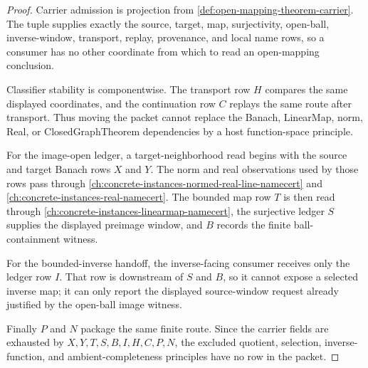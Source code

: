 \begin{proof}
Carrier admission is projection from \autoref{def:open-mapping-theorem-carrier}. The tuple supplies exactly the source, target, map, surjectivity, open-ball, inverse-window, transport, replay, provenance, and local name rows, so a consumer has no other coordinate from which to read an open-mapping conclusion.

Classifier stability is componentwise. The transport row $H$ compares the same displayed coordinates, and the continuation row $C$ replays the same route after transport. Thus moving the packet cannot replace the Banach, LinearMap, norm, Real, or ClosedGraphTheorem dependencies by a host function-space principle.

For the image-open ledger, a target-neighborhood read begins with the source and target Banach rows $X$ and $Y$. The norm and real observations used by those rows pass through \autoref{ch:concrete-instances-normed-real-line-namecert} and \autoref{ch:concrete-instances-real-namecert}. The bounded map row $T$ is then read through \autoref{ch:concrete-instances-linearmap-namecert}, the surjective ledger $S$ supplies the displayed preimage window, and $B$ records the finite ball-containment witness.

For the bounded-inverse handoff, the inverse-facing consumer receives only the ledger row $I$. That row is downstream of $S$ and $B$, so it cannot expose a selected inverse map; it can only report the displayed source-window request already justified by the open-ball image witness.

Finally $P$ and $N$ package the same finite route. Since the carrier fields are exhausted by $X,Y,T,S,B,I,H,C,P,N$, the excluded quotient, selection, inverse-function, and ambient-completeness principles have no row in the packet.
\end{proof}

